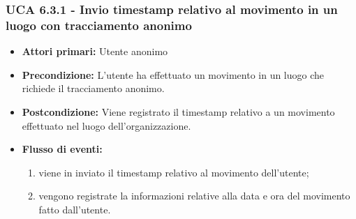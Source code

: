 \subsubsection{UCA 6.3.1 - Invio timestamp relativo al movimento in un luogo con tracciamento anonimo}
\begin{itemize}
	\item \textbf{Attori primari:} Utente anonimo
	\item \textbf{Precondizione:} L'utente ha effettuato un movimento in un luogo che richiede il tracciamento anonimo.
	\item \textbf{Postcondizione:} Viene registrato il timestamp relativo a un movimento effettuato nel luogo dell'organizzazione.
	\item \textbf{Flusso di eventi:}
	\begin{enumerate}
		\item viene in inviato il timestamp relativo al movimento dell'utente;
		\item vengono registrate la informazioni relative alla data e ora del movimento fatto dall'utente.
	\end{enumerate}
\end{itemize}

